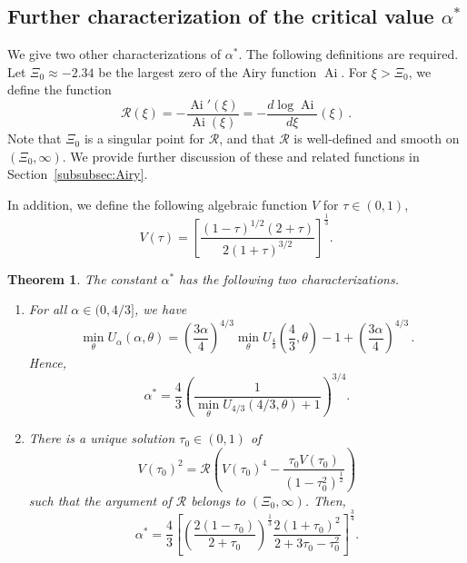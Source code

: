 \documentclass[10pt]{amsart}
\newtheorem{theo}{Theorem}[section]
\theoremstyle{definition}\newtheorem{defi}[theo]{Definition}\newtheorem{rema}[theo]{Remark}\newtheorem{exam}[theo]{Example}\newtheorem{exem}[theo]{Example}\newtheorem{nota}[theo]{Notation}
\DeclareMathOperator{\Ai}{Ai}
\newcommand{\mR}{\mathcal{R}}
\newcommand{\1}{\mathds{1}}
\newcommand*{\romanenumi}{\renewcommand*{\theenumi}{\roman{enumi}}}
\begin{document}
\subsection*{Further characterization of the critical value \texorpdfstring{$\alpha^*$}{alpha*}}



We give two other characterizations of $\alpha^*$. The following definitions are required. Let $\Xi_0\approx -2.34$ be the largest zero of the Airy function $\Ai$. For $\xi > \Xi_0$, we define the function
\begin{equation}\label{eq:riccati}
\mR(\xi) = - \frac{ \Ai'(\xi)}{ \Ai(\xi) } = - \frac{d \log \Ai}{d\xi} (\xi) \,.
\end{equation}
Note that $\Xi_0$ is a singular point for $\mR$, and that $\mR$ is well-defined and smooth on $(\Xi_0,\infty)$. We provide further discussion of these and related functions in Section~\ref{subsubsec:Airy}.


In addition, we define the following algebraic function $V$ for $\tau \in (0,1)$,
\begin{equation}\label{eq:V}
V(\tau) = \left[\frac{(1-\tau)^{1/2}(2+\tau)}{2(1+\tau)^{3/2}}\right]^\frac13.
\end{equation}



\begin{theo}\label{thm:alpha}
The constant $\alpha^*$ has the following two characterizations.
\begin{enumerate}\romanenumi
\item \label{theo1.3.1} For all $\alpha \in (0,4/3]$, we have
\begin{equation}\label{eq:U_scaling}
\min_\theta U_\alpha(\alpha,\theta) = \left(\frac{3\alpha}{4}\right)^{4/3} \min_\theta U_{\frac43}\left (\frac43, \theta\right) -1 + \left(\frac{3\alpha}{4}\right)^{4/3} \,.
\end{equation}
Hence,
\[
\alpha^* = \frac{4}{3} \left(\frac{1}{\min\limits_\theta U_{4/3}(4/3, \theta) + 1}\right)^{3/4}.
\]
\item \label{theo1.3.2} There is a unique solution $\tau_0\in (0,1)$ of
\begin{equation}\label{eq:V_condition}
V(\tau_0)^2 = \mR\left(V(\tau_0)^4 - \frac{\tau_0 V(\tau_0)}{\left (1-\tau_0^2\right)^\frac12}\right)
\end{equation}
such that the argument of $\mR$ belongs to $(\Xi_0,\infty)$. Then,
\begin{equation}\label{eq:alpha^* TH}
\alpha^* = \frac{4}{3} \left[\left(\frac{2(1-\tau_0)}{2+\tau_0}\right)^\frac13 \frac{2(1+\tau_0)^2}{2 + 3 \tau_0 - \tau_0^2} \right]^{\frac34}.
\end{equation}
\end{enumerate}
\end{theo}
\end{document}
